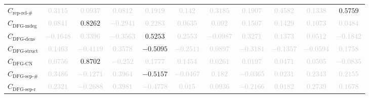 \documentclass{standalone}
\newcommand{\reprelnumname}{\text{rep-rel-\#}}
\newcommand{\reprelnum}{C_{\reprelnumname}}
\newcommand{\dfgmaxdegname}{\text{DFG-mdeg}}
\newcommand{\dfgmaxdeg}{C_{\dfgmaxdegname}}
\newcommand{\dfgdensname}{\text{DFG-dens}}
\newcommand{\dfgdens}{C_{\dfgdensname}}
\newcommand{\dfgstructname}{\text{DFG-struct}}
\newcommand{\dfgstruct}{C_{\dfgstructname}}
\newcommand{\dfgcycnumbername}{\text{DFG-CN}}
\newcommand{\dfgcycnumber}{C_{\dfgcycnumbername}}
\newcommand{\dfgsepnumname}{\text{DFG-sep-\#}}
\newcommand{\dfgsepnum}{C_{\dfgsepnumname}}
\newcommand{\dfgseprationame}{\text{DFG-sep-r}}
\newcommand{\dfgsepratio}{C_{\dfgseprationame}}
\begin{document}
\begin{tabular}{lcccccccccc}
$\reprelnum$ & \textcolor{lightgray}{$0.3115$} & \textcolor{lightgray}{$0.0937$} & \textcolor{lightgray}{$0.0812$} & \textcolor{lightgray}{$0.1919$} & \textcolor{lightgray}{$0.142$} & \textcolor{lightgray}{$0.3185$} & \textcolor{lightgray}{$0.1907$} & \textcolor{lightgray}{$0.4582$} & \textcolor{lightgray}{$0.1338$} & $0.5759$ \\ 
$\dfgmaxdeg$ & \textcolor{lightgray}{$0.0841$} & $0.8262$ & \textcolor{lightgray}{$-0.2941$} & \textcolor{lightgray}{$0.2283$} & \textcolor{lightgray}{$0.0635$} & \textcolor{lightgray}{$0.092$} & \textcolor{lightgray}{$0.1507$} & \textcolor{lightgray}{$0.1429$} & \textcolor{lightgray}{$0.1073$} & \textcolor{lightgray}{$0.0484$} \\ 
$\dfgdens$ & \textcolor{lightgray}{$-0.1648$} & \textcolor{lightgray}{$0.3396$} & \textcolor{lightgray}{$-0.3563$} & $0.5253$ & \textcolor{lightgray}{$0.2553$} & \textcolor{lightgray}{$-0.0987$} & \textcolor{lightgray}{$0.3271$} & \textcolor{lightgray}{$0.1373$} & \textcolor{lightgray}{$0.0512$} & \textcolor{lightgray}{$-0.1842$} \\ 
$\dfgstruct$ & \textcolor{lightgray}{$0.1463$} & \textcolor{lightgray}{$-0.4119$} & \textcolor{lightgray}{$0.3578$} & $-0.5095$ & \textcolor{lightgray}{$-0.2511$} & \textcolor{lightgray}{$0.0897$} & \textcolor{lightgray}{$-0.3181$} & \textcolor{lightgray}{$-0.1357$} & \textcolor{lightgray}{$-0.0594$} & \textcolor{lightgray}{$0.1758$} \\ 
$\dfgcycnumber$ & \textcolor{lightgray}{$0.0756$} & $0.8702$ & \textcolor{lightgray}{$-0.252$} & \textcolor{lightgray}{$0.1777$} & \textcolor{lightgray}{$0.1454$} & \textcolor{lightgray}{$0.0261$} & \textcolor{lightgray}{$0.0197$} & \textcolor{lightgray}{$0.0471$} & \textcolor{lightgray}{$0.0505$} & \textcolor{lightgray}{$-0.0835$} \\ 
$\dfgsepnum$ & \textcolor{lightgray}{$0.3486$} & \textcolor{lightgray}{$-0.1271$} & \textcolor{lightgray}{$0.3964$} & $-0.5157$ & \textcolor{lightgray}{$-0.0467$} & \textcolor{lightgray}{$0.182$} & \textcolor{lightgray}{$-0.0365$} & \textcolor{lightgray}{$0.0231$} & \textcolor{lightgray}{$0.2343$} & \textcolor{lightgray}{$0.2155$} \\ 
$\dfgsepratio$ & \textcolor{lightgray}{$0.2321$} & \textcolor{lightgray}{$-0.2688$} & \textcolor{lightgray}{$0.3981$} & \textcolor{lightgray}{$-0.4778$} & \textcolor{lightgray}{$0.015$} & \textcolor{lightgray}{$0.0936$} & \textcolor{lightgray}{$-0.2166$} & \textcolor{lightgray}{$0.0182$} & \textcolor{lightgray}{$0.2739$} & \textcolor{lightgray}{$0.1678$} \\ 

\end{tabular}
\end{document}
